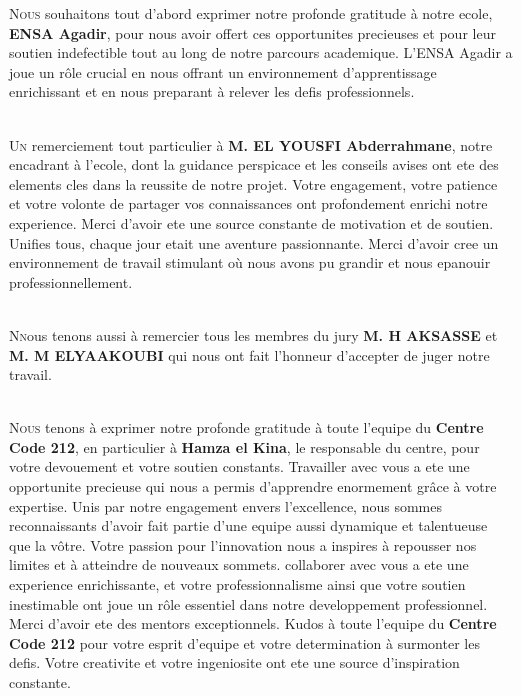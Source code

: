 
\lettrine[nindent=0em, slope=-.5em] {\color{Eblue}N}{ous} souhaitons tout d'abord exprimer notre profonde gratitude à notre ecole, \textbf{ENSA Agadir}, pour nous avoir offert ces opportunites precieuses et pour leur soutien indefectible tout au long de notre parcours academique. L'ENSA Agadir a joue un rôle crucial en nous offrant un environnement d'apprentissage enrichissant et en nous preparant à relever les defis professionnels.

\ \\

\lettrine[nindent=0em, slope=-.5em] {\color{Eblue}U}{n} remerciement tout particulier à \textbf{M. EL YOUSFI Abderrahmane}, notre encadrant à l'ecole, dont la guidance perspicace et les conseils avises ont ete des elements cles dans la reussite de notre projet. Votre engagement, votre patience et votre volonte de partager vos connaissances ont profondement enrichi notre experience. Merci d'avoir ete une source constante de motivation et de soutien. Unifies tous, chaque jour etait une aventure passionnante. Merci d'avoir cree un environnement de travail stimulant où nous avons pu grandir et nous epanouir professionnellement.

\ \\

\lettrine[nindent=0em, slope=-.5em] {\color{Eblue}N}{n}ous tenons aussi à remercier tous les membres du jury \textbf{M. H AKSASSE} et \textbf{M. M ELYAAKOUBI} qui nous ont fait l'honneur d'accepter de juger notre travail.

\ \\

\lettrine[nindent=0em, slope=-.5em] {\color{Eblue}N}{ous} tenons à exprimer notre profonde gratitude à toute l'equipe du \textbf{Centre Code 212}, en particulier à \textbf{Hamza el Kina}, le responsable du centre, pour votre devouement et votre soutien constants. Travailler avec vous a ete une opportunite precieuse qui nous a permis d'apprendre enormement grâce à votre expertise. Unis par notre engagement envers l'excellence, nous sommes reconnaissants d'avoir fait partie d'une equipe aussi dynamique et talentueuse que la vôtre. Votre passion pour l'innovation nous a inspires à repousser nos limites et à atteindre de nouveaux sommets. collaborer avec vous a ete une experience enrichissante, et votre professionnalisme ainsi que votre soutien inestimable ont joue un rôle essentiel dans notre developpement professionnel. Merci d'avoir ete des mentors exceptionnels. Kudos à toute l'equipe du \textbf{Centre Code 212} pour votre esprit d'equipe et votre determination à surmonter les defis. Votre creativite et votre ingeniosite ont ete une source d'inspiration constante.

\ \\
